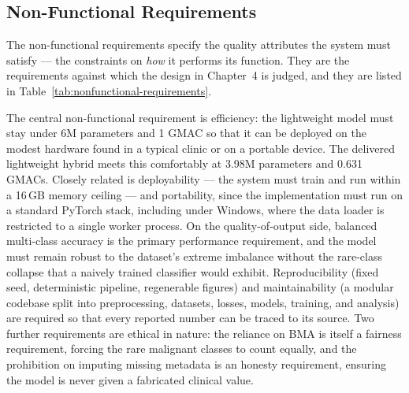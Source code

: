 \subsection{Non-Functional Requirements}
\label{sec:nonfunctional-requirements}

The non-functional requirements specify the quality attributes the system
must satisfy --- the constraints on \emph{how} it performs its function.
They are the requirements against which the design in Chapter~4 is judged,
and they are listed in Table~\ref{tab:nonfunctional-requirements}.

The central non-functional requirement is efficiency: the lightweight model
must stay under 6M parameters and 1 GMAC so that it can be deployed on the
modest hardware found in a typical clinic or on a portable device. The
delivered lightweight hybrid meets this comfortably at 3.98M parameters and
0.631 GMACs. Closely related is deployability --- the system must train and
run within a 16\,GB memory ceiling --- and portability, since the
implementation must run on a standard PyTorch stack, including under Windows,
where the data loader is restricted to a single worker process. On the
quality-of-output side, balanced multi-class accuracy is the primary
performance requirement, and the model must remain robust to the dataset's
extreme imbalance without the rare-class collapse that a naively trained
classifier would exhibit. Reproducibility (fixed seed, deterministic
pipeline, regenerable figures) and maintainability (a modular codebase split
into preprocessing, datasets, losses, models, training, and analysis) are
required so that every reported number can be traced to its source. Two
further requirements are ethical in nature: the reliance on BMA is itself a
fairness requirement, forcing the rare malignant classes to count equally,
and the prohibition on imputing missing metadata is an honesty requirement,
ensuring the model is never given a fabricated clinical value.

